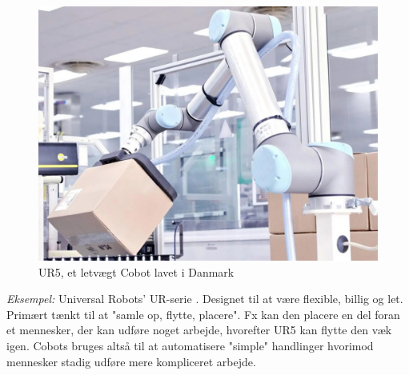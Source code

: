 \begin{figure}[H]
    \centering
    \includegraphics[width=0.5\linewidth]{Sections/2 Problemanalyse/Media/URrobot.jpg}
    \caption{UR5, et letvægt Cobot lavet i Danmark \parencite{2023URSeries}}
    \label{fig:ur5pic}
\end{figure}

\textit{Eksempel:} Universal Robots' UR-serie \parencite{2023URSeries}. Designet til at være flexible, billig og let. Primært tænkt til at "samle op, flytte, placere". Fx kan den placere en del foran et mennesker, der kan udføre noget arbejde, hvorefter UR5 kan flytte den væk igen. Cobots bruges altså til at automatisere "simple" handlinger hvorimod mennesker stadig udføre mere kompliceret arbejde.

 
